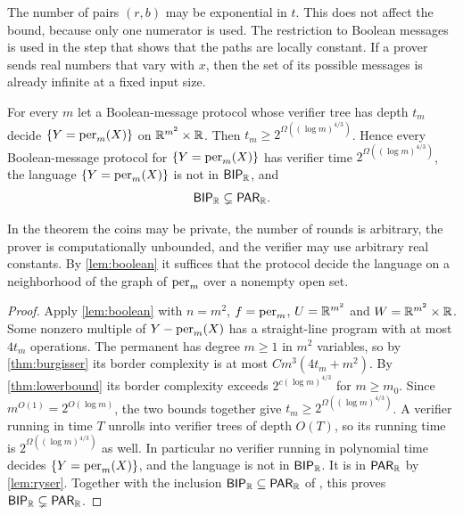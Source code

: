 The number of pairs $(r,b)$ may be exponential in $t$.
This does not affect the bound, because only one numerator is used.
The restriction to Boolean messages is used in the step that shows that the paths are locally constant.
If a prover sends real numbers that vary with $x$, then the set of its possible messages is already infinite at a fixed input size.

\begin{theorem}\label{thm:bip}
For every $m$ let a Boolean-message protocol whose verifier tree has depth $t_m$ decide $\{Y=\operatorname{per}_m(X)\}$ on $\mathbb{R}^{m^2}\times\mathbb{R}$.
Then $t_m\ge2^{\Omega((\log m)^{4/3})}$.
Hence every Boolean-message protocol for $\{Y=\operatorname{per}_m(X)\}$ has verifier time $2^{\Omega((\log m)^{4/3})}$, the language $\{Y=\operatorname{per}_m(X)\}$ is not in $\textsf{\upshape BIP}_{\mathbb{R}}$, and
\[
\textsf{\upshape BIP}_{\mathbb{R}}\subsetneq\textsf{\upshape PAR}_{\mathbb{R}} .
\]
\end{theorem}

In the theorem the coins may be private, the number of rounds is arbitrary, the prover is computationally unbounded, and the verifier may use arbitrary real constants.
By \cref{lem:boolean} it suffices that the protocol decide the language on a neighborhood of the graph of $\operatorname{per}_m$ over a nonempty open set.

\begin{proof}
Apply \cref{lem:boolean} with $n=m^2$, $f=\operatorname{per}_m$, $U=\mathbb{R}^{m^2}$ and $W=\mathbb{R}^{m^2}\times\mathbb{R}$.
Some nonzero multiple of $Y-\operatorname{per}_m(X)$ has a straight-line program with at most $4t_m$ operations.
The permanent has degree $m\ge1$ in $m^2$ variables, so by \cref{thm:burgisser} its border complexity is at most $Cm^3(4t_m+m^2)$.
By \cref{thm:lowerbound} its border complexity exceeds $2^{c(\log m)^{4/3}}$ for $m\ge m_0$.
Since $m^{O(1)}=2^{O(\log m)}$, the two bounds together give $t_m\ge2^{\Omega((\log m)^{4/3})}$.
A verifier running in time $T$ unrolls into verifier trees of depth $O(T)$, so its running time is $2^{\Omega((\log m)^{4/3})}$ as well.
In particular no verifier running in polynomial time decides $\{Y=\operatorname{per}_m(X)\}$, and the language is not in $\textsf{\upshape BIP}_{\mathbb{R}}$.
It is in $\textsf{\upshape PAR}_{\mathbb{R}}$ by \cref{lem:ryser}.
Together with the inclusion $\textsf{\upshape BIP}_{\mathbb{R}}\subseteq\textsf{\upshape PAR}_{\mathbb{R}}$ of \cite{IdR99}, this proves $\textsf{\upshape BIP}_{\mathbb{R}}\subsetneq\textsf{\upshape PAR}_{\mathbb{R}}$.
\end{proof}

